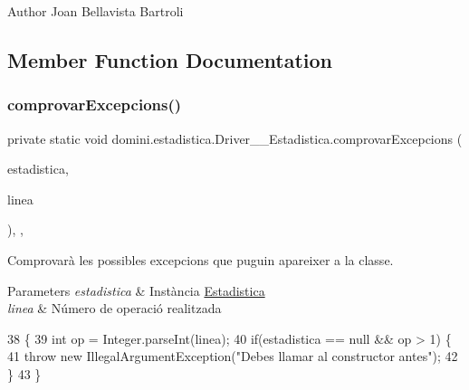 \begin{DoxyAuthor}{Author}
Joan Bellavista Bartroli 
\end{DoxyAuthor}


\subsection{Member Function Documentation}
\mbox{\label{classdomini_1_1estadistica_1_1Driver____Estadistica_a3459f11af9841b23ac81a409a3e84e22}} 
\subsubsection{\texorpdfstring{comprovar\+Excepcions()}{comprovarExcepcions()}}
{\footnotesize\ttfamily private static void domini.\+estadistica.\+Driver\+\_\+\+\_\+\+Estadistica.\+comprovar\+Excepcions (\begin{DoxyParamCaption}\item[{\hyperlink{classdomini_1_1estadistica_1_1Estadistica}{Estadistica}}]{estadistica,  }\item[{String}]{linea }\end{DoxyParamCaption})\hspace{0.3cm}{\ttfamily [inline]}, {\ttfamily [static]}, {\ttfamily [private]}}



Comprovarà les possibles excepcions que puguin apareixer a la classe. 


\begin{DoxyParams}{Parameters}
{\em estadistica} & Instància \hyperlink{classdomini_1_1estadistica_1_1Estadistica}{Estadistica} \\
\hline
{\em linea} & Número de operació realitzada \\
\hline
\end{DoxyParams}

\begin{DoxyCode}
38                                                                                   \{
39         \textcolor{keywordtype}{int} op = Integer.parseInt(linea);
40         \textcolor{keywordflow}{if}(estadistica == null && op > 1) \{
41             \textcolor{keywordflow}{throw} \textcolor{keyword}{new} IllegalArgumentException(\textcolor{stringliteral}{"Debes llamar al constructor antes"});
42         \}
43     \}
\end{DoxyCode}
\mbox{\label{classdomini_1_1estadistica_1_1Driver____Estadistica_a7f11e0ccad919e427af9c591cf910bfe}} 

